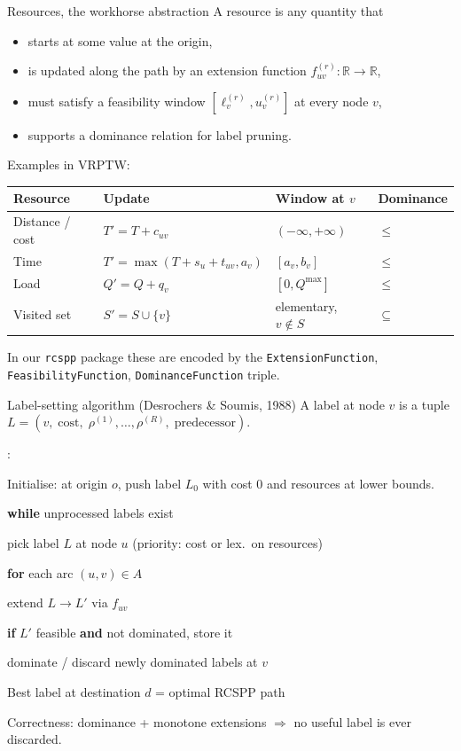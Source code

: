 \documentclass[10pt,aspectratio=169]{beamer}
\newcounter{algoline}
\newenvironment{algo}[1][Algorithm]{%
  \setcounter{algoline}{0}%
  \begin{tcolorbox}[colback=soft,colframe=accent2!70,sharp corners,
      boxrule=0.4pt,left=4pt,right=4pt,top=2pt,bottom=2pt,
      title=\textbf{#1}]%
  \ttfamily\small
  \begin{list}{\stepcounter{algoline}\textcolor{accent2}{\scriptsize\arabic{algoline}:}}%
    {\setlength{\leftmargin}{2.0em}\setlength{\itemsep}{0.1em}\setlength{\topsep}{0pt}}%
}{%
  \end{list}\end{tcolorbox}%
}
\newcommand{\Indent}{\hspace*{1.2em}}
\newcommand{\IndentTwo}{\hspace*{2.4em}}
\newcommand{\R}{\mathbb{R}}
\begin{document}
\begin{frame}{Resources, the workhorse abstraction}
  A \alert{resource} is any quantity that
  \begin{itemize}\small
    \item starts at some value at the origin,
    \item is updated along the path by an \alert{extension function}
          $f^{(r)}_{uv}\!:\R\!\to\!\R$,
    \item must satisfy a \alert{feasibility window} $[\ell^{(r)}_v,u^{(r)}_v]$ at every node $v$,
    \item supports a \alert{dominance relation} for label pruning.
  \end{itemize}

  Examples in VRPTW:
  \begin{tabular}{@{}llll@{}}
    \toprule
    Resource & Update & Window at $v$ & Dominance \\
    \midrule
    Distance / cost & $T'\!=\!T+c_{uv}$ & $(-\!\infty,+\!\infty)$ & $\le$ \\
    Time           & $T'\!=\!\max(T+s_u+t_{uv},a_v)$ & $[a_v,b_v]$ & $\le$ \\
    Load           & $Q'\!=\!Q+q_v$ & $[0,Q^{\max}]$ & $\le$ \\
    Visited set    & $S'\!=\!S\cup\{v\}$ & elementary, $v\notin S$ & $\subseteq$ \\
    \bottomrule
  \end{tabular}
  
  In our \texttt{rcspp} package these are encoded by the
  \texttt{ExtensionFunction}, \texttt{FeasibilityFunction},
  \texttt{DominanceFunction} triple.
\end{frame}

\begin{frame}{Label-setting algorithm (Desrochers \& Soumis, 1988)}
  A \alert{label} at node $v$ is a tuple
  $L=(v,\;\text{cost},\;\rho^{(1)},\dots,\rho^{(R)},\;\text{predecessor})$.

  \begin{algo}[Generic label-setting]
  \item Initialise: at origin $o$, push label $L_0$ with cost $0$ and resources at lower bounds.
  \item \textbf{while} unprocessed labels exist
  \item \Indent pick label $L$ at node $u$ (priority: cost or lex.\ on resources)
  \item \Indent \textbf{for} each arc $(u,v)\in A$
  \item \IndentTwo extend $L\to L'$ via $f_{uv}$
  \item \IndentTwo \textbf{if} $L'$ feasible \textbf{and} not dominated, store it
  \item \Indent dominate / discard newly dominated labels at $v$
  \item Best label at destination $d$ = optimal RCSPP path
  \end{algo}
  Correctness: dominance + monotone extensions $\Rightarrow$ no useful label
  is ever discarded.
\end{frame}
\end{document}
